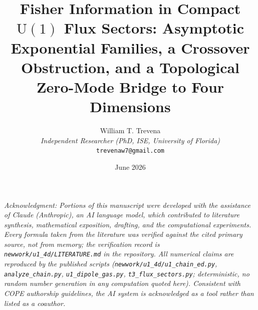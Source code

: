 \documentclass[11pt]{article}
\title{Fisher Information in Compact $\mathrm{U}(1)$ Flux Sectors: Asymptotic Exponential Families, a Crossover Obstruction, and a Topological Zero-Mode Bridge to Four Dimensions}
\author{William T. Trevena\\[3pt]
{\small\itshape Independent Researcher (PhD, ISE, University of Florida)}\\
{\small\texttt{trevenaw7@gmail.com}}}
\date{June 2026}
\theoremstyle{remark}
\theoremstyle{plain}
\begin{document}
\maketitle

{\small\itshape Acknowledgment: Portions of this manuscript were developed with the assistance of Claude (Anthropic), an AI language model, which contributed to literature synthesis, mathematical exposition, drafting, and the computational experiments. Every formula taken from the literature was verified against the cited primary source, not from memory; the verification record is \texttt{newwork/u1\_4d/LITERATURE.md} in the repository. All numerical claims are reproduced by the published scripts (\texttt{newwork/u1\_4d/u1\_chain\_ed.py}, \texttt{analyze\_chain.py}, \texttt{u1\_dipole\_gas.py}, \texttt{t3\_flux\_sectors.py}; deterministic, no random number generation in any computation quoted here). Consistent with COPE authorship guidelines, the AI system is acknowledged as a tool rather than listed as a coauthor.}
\end{document}
